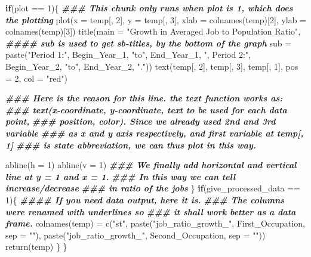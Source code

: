 \documentclass[
]{article}
\newenvironment{Shaded}{\begin{snugshade}}{\end{snugshade}}
\newcommand{\AttributeTok}[1]{\textcolor[rgb]{0.77,0.63,0.00}{#1}}
\newcommand{\ControlFlowTok}[1]{\textcolor[rgb]{0.13,0.29,0.53}{\textbf{#1}}}
\newcommand{\DecValTok}[1]{\textcolor[rgb]{0.00,0.00,0.81}{#1}}
\newcommand{\DocumentationTok}[1]{\textcolor[rgb]{0.56,0.35,0.01}{\textbf{\textit{#1}}}}
\newcommand{\FunctionTok}[1]{\textcolor[rgb]{0.00,0.00,0.00}{#1}}
\newcommand{\NormalTok}[1]{#1}
\newcommand{\OtherTok}[1]{\textcolor[rgb]{0.56,0.35,0.01}{#1}}
\newcommand{\SpecialCharTok}[1]{\textcolor[rgb]{0.00,0.00,0.00}{#1}}
\newcommand{\StringTok}[1]{\textcolor[rgb]{0.31,0.60,0.02}{#1}}
\begin{document}
\begin{Shaded}
\begin{Highlighting}[]
  \ControlFlowTok{if}\NormalTok{(plot }\SpecialCharTok{==} \DecValTok{1}\NormalTok{)\{}
    \DocumentationTok{\#\#\# This chunk only runs when plot is 1, which does the plotting}
    \FunctionTok{plot}\NormalTok{(}\AttributeTok{x =}\NormalTok{ temp[, }\DecValTok{2}\NormalTok{], }\AttributeTok{y =}\NormalTok{ temp[, }\DecValTok{3}\NormalTok{],}
         \AttributeTok{xlab =} \FunctionTok{colnames}\NormalTok{(temp)[}\DecValTok{2}\NormalTok{],}
         \AttributeTok{ylab =} \FunctionTok{colnames}\NormalTok{(temp)[}\DecValTok{3}\NormalTok{])}
    \FunctionTok{title}\NormalTok{(}\AttributeTok{main =} \StringTok{"Growth in Averaged Job to Population Ratio"}\NormalTok{,}
          \DocumentationTok{\#\#\#\# sub is used to get sb{-}titles, by the bottom of the graph}
          \AttributeTok{sub =} \FunctionTok{paste}\NormalTok{(}\StringTok{"Period 1:"}\NormalTok{, Begin\_Year\_1, }\StringTok{"to"}\NormalTok{, End\_Year\_1, }
                      \StringTok{", Period 2:"}\NormalTok{, Begin\_Year\_2, }\StringTok{"to"}\NormalTok{, End\_Year\_2, }\StringTok{"."}\NormalTok{))}
    \FunctionTok{text}\NormalTok{(temp[, }\DecValTok{2}\NormalTok{], temp[, }\DecValTok{3}\NormalTok{], temp[, }\DecValTok{1}\NormalTok{], }\AttributeTok{pos =} \DecValTok{2}\NormalTok{, }\AttributeTok{col =} \StringTok{"red"}\NormalTok{)}
    
    \DocumentationTok{\#\#\# Here is the reason for this line. the text function works as:}
    \DocumentationTok{\#\#\# text(x{-}coordinate, y{-}coordinate, text to be used for each data point,}
    \DocumentationTok{\#\#\# position, color). Since we already used 2nd and 3rd variable}
    \DocumentationTok{\#\#\# as x and y axis respectively, and first variable at temp[, 1]}
    \DocumentationTok{\#\#\# is state abbreviation, we can thus plot in this way.}
    
    \FunctionTok{abline}\NormalTok{(}\AttributeTok{h =} \DecValTok{1}\NormalTok{)}
    \FunctionTok{abline}\NormalTok{(}\AttributeTok{v =} \DecValTok{1}\NormalTok{)}
    \DocumentationTok{\#\#\# We finally add horizontal and vertical line at y = 1 and x = 1. }
    \DocumentationTok{\#\#\# In this way we can tell increase/decrease}
    \DocumentationTok{\#\#\# in ratio of the jobs}
\NormalTok{  \}}
  \ControlFlowTok{if}\NormalTok{(give\_processed\_data }\SpecialCharTok{==} \DecValTok{1}\NormalTok{)\{}
    \DocumentationTok{\#\#\#\# If you need data output, here it is.}
    \DocumentationTok{\#\#\# The columns were renamed with underlines so }
    \DocumentationTok{\#\#\# it shall work better as a data frame.}
    \FunctionTok{colnames}\NormalTok{(temp) }\OtherTok{=} \FunctionTok{c}\NormalTok{(}\StringTok{"st"}\NormalTok{, }
                       \FunctionTok{paste}\NormalTok{(}\StringTok{"job\_ratio\_growth\_"}\NormalTok{, First\_Occupation, }\AttributeTok{sep =} \StringTok{""}\NormalTok{),}
                       \FunctionTok{paste}\NormalTok{(}\StringTok{"job\_ratio\_growth\_"}\NormalTok{, Second\_Occupation, }\AttributeTok{sep =} \StringTok{""}\NormalTok{))}
    \FunctionTok{return}\NormalTok{(temp)}
\NormalTok{  \}}
\NormalTok{\}}
\end{Highlighting}
\end{Shaded}
\end{document}

